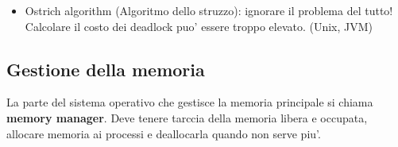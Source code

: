 \documentclass[a4paper,12pt]{article}
\begin{document}
\begin{itemize}
\paragraph{Teorema dell'algoritmo del banchiere} Siano $C, C'$ le sequenze di processi. Sia $H = \{p \in \text{ processi } | p \notin C\}$. Sia $h$ il primo elemento di $H$ che compare in $C'$. \\
Tutti gli elementi di $C'$ prima di $h$ sono in $C$. Chiamiamo $C''$ il segmento iniziale di $C'$ fino al punto precendente l'applicazione di $h$.\\
Le risorse diponibili all'applicazione di $h$ in $C'$ sono $avail(C'')\, = \, COH + \sum_{j \in C} p_j$; $h$ e' applicabile quindi $n \leq avail(C'')$.\\
Ma $avail(C) \, = \, COH + \sum_{j \in C} p_j$ quinsi se $avail(C) \leq avail(C'')$ allora $h$ e' applicabile alla fine di $C$ contro l'ipotesi che $C$ non sia ulteriormente estendibile (SAFE).\\
   \item Ostrich algorithm (Algoritmo dello struzzo): ignorare il problema del tutto!\\
    Calcolare il costo dei deadlock puo' essere troppo elevato. (Unix, JVM)
\end{itemize}
\subsection{Gestione della memoria}
La parte del sistema operativo che gestisce la memoria principale si chiama \textbf{memory manager}. Deve tenere tarccia della memoria libera e occupata, allocare memoria ai processi e deallocarla quando non serve piu'.
\end{document}
